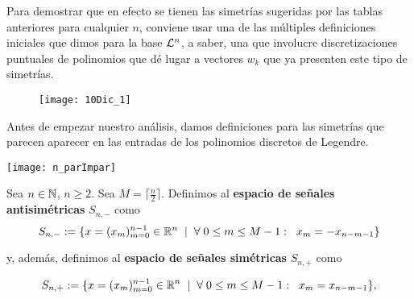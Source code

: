 Para demostrar que en efecto se tienen las simetrías
sugeridas por las tablas anteriores
para cualquier $n$,
conviene
usar una de las múltiples definiciones iniciales
que dimos para la base $\mathcal{L}^{n}$, a saber, una
que involucre discretizaciones puntuales de polinomios 
que dé lugar a vectores $w_{k}$ que ya presenten 
este tipo de simetrías.


\begin{figure}[H]
	\centering
	\texttt{[image: 10Dic\_1]} 
\end{figure}	

Antes de empezar nuestro análisis, damos definiciones
para las simetrías que parecen aparecer en las entradas
de los polinomios discretos de Legendre.

\begin{marginfigure}
\texttt{[image: n\_parImpar]} 
\end{marginfigure}


\begin{defi}
\label{def: espacios de seniales simetricas y antisimetricas}
Sea $n \in \mathbb{N}$, $n \geq 2$. 
Sea $M = \lceil \frac{n}{2} \rceil$.
Definimos al 
\textbf{espacio de señales antisimétricas} $S_{n,-}$ como 
	\begin{equation}
	\label{eq: def de Sn-}
	S_{n, -}:= \{ x=(x_{m})_{m=0}^{n-1}  \in \mathbb{R}^{n}
	\hspace{0.2cm} |
	\hspace{0.2cm} \forall  
	\hspace{0.1cm}
	0 \leq m \leq M-1 : \hspace{0.2cm} x_{m}= -x_{n-m-1}\}
	\end{equation}

\noindent	
y, además, definimos al
\textbf{espacio de señales simétricas} $S_{n,+}$ como 
 
	\begin{equation}
	\label{eq: def de Sn+}
	S_{n, +}:= \{ x=(x_{m})_{m=0}^{n-1} \in \mathbb{R}^{n} \hspace{0.2cm} 
	| \hspace{0.2cm} \forall  
	\hspace{0.1cm}
	0 \leq m \leq M-1 : \hspace{0.2cm} x_{m}= x_{n-m-1}\},
	\end{equation}
\end{defi}


